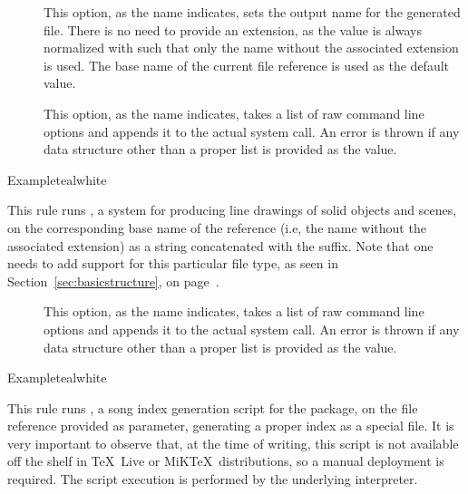 \begin{description}
\begin{description}
\item[] This option, as the name indicates, sets the output name for the generated  file. There is no need to provide an extension, as the value is always normalized with  such that only the name without the associated extension is used. The base name of the current file reference is used as the default value.

\item[] This option, as the name indicates, takes a list of raw command line options and appends it to the actual system call. An error is thrown if any data structure other than a proper list is provided as the value.
\end{description}

\begin{codebox}{Example}{teal}{\icnote}{white}
\end{codebox}

\item[\rulebox{sketch}{Sergey Ulyanov, Paulo Cereda}] This rule runs , a system for producing line drawings of solid objects and scenes, on the corresponding base name of the  reference (i.e, the name without the associated extension) as a string concatenated with the  suffix. Note that one needs to add support for this particular file type, as seen in Section~\ref{sec:basicstructure}, on page~\pageref{sec:basicstructure}.

\begin{description}
\item[] This option, as the name indicates, takes a list of raw command line options and appends it to the actual system call. An error is thrown if any data structure other than a proper list is provided as the value.
\end{description}

\begin{codebox}{Example}{teal}{\icnote}{white}
\end{codebox}

\item[\rulebox{songidx}{Francesco Endrici, Paulo Cereda}] This rule runs , a song index generation script for the  package, on the file reference provided as parameter, generating a proper index as a special  file. It is very important to observe that, at the time of writing, this script is not available off the shelf in \TeX\ Live or MiK\TeX\ distributions, so a manual deployment is required. The script execution is performed by the underlying  interpreter.


\end{description}

